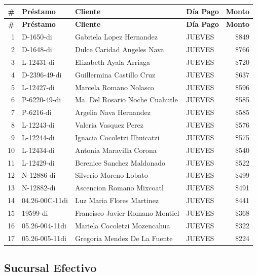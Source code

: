 \documentclass[11pt,a4paper]{article}
\newcommand{\money}[1]{\$\num{#1}}
\begin{document}
\begin{center}
\renewcommand{\arraystretch}{1.1}
\footnotesize
\begin{longtable}{rlp{6.5cm}lr}
\toprule
\textbf{\#} & \textbf{Pr\'estamo} & \textbf{Cliente} & \textbf{D\'ia Pago} & \textbf{Monto} \\
\midrule
\endfirsthead
\toprule
\textbf{\#} & \textbf{Pr\'estamo} & \textbf{Cliente} & \textbf{D\'ia Pago} & \textbf{Monto} \\
\midrule
\endhead
1 & D-1650-di & Gabriela Lopez Hernandez & JUEVES & \money{849} \\
2 & D-1648-di & Dulce Caridad Angeles Nava & JUEVES & \money{766} \\
3 & L-12431-di & Elizabeth Ayala Arriaga & JUEVES & \money{720} \\
4 & D-2396-49-di & Guillermina Castillo Cruz & JUEVES & \money{637} \\
5 & L-12427-di & Marcela Romano Nolasco & JUEVES & \money{596} \\
6 & P-6220-49-di & Ma. Del Rosario Noche Cuahutle & JUEVES & \money{585} \\
7 & P-6216-di & Argelia Nava Hernandez & JUEVES & \money{585} \\
8 & L-12243-di & Valeria Vasquez Perez & JUEVES & \money{576} \\
9 & L-12244-di & Ignacia Cocoletzi Ilhuicatzi & JUEVES & \money{575} \\
10 & L-12434-di & Antonia Maravilla Corona & JUEVES & \money{540} \\
11 & L-12429-di & Berenice Sanchez Maldonado & JUEVES & \money{522} \\
12 & N-12886-di & Silverio Moreno Lobato & JUEVES & \money{499} \\
13 & N-12882-di & Ascencion Romano Mixcoatl & JUEVES & \money{491} \\
14 & 04.26-00C-11di & Luz Maria Flores Martinez & JUEVES & \money{441} \\
15 & 19599-di & Francisco Javier Romano Montiel & JUEVES & \money{368} \\
16 & 05.26-004-11di & Mariela Cocoletzi Mozencahua & JUEVES & \money{322} \\
17 & 05.26-005-11di & Gregoria Mendez De La Fuente & JUEVES & \money{224} \\

\bottomrule
\end{longtable}
\end{center}
\newpage
\subsection{Sucursal Efectivo}
\end{document}
